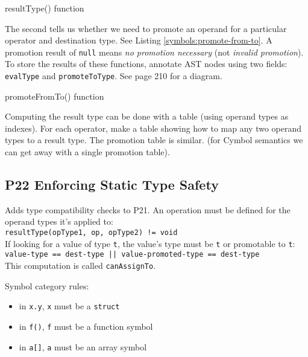 \begin{program}
\caption{resultType() function\label{symbols:result-type}}
\end{program}

The second tells us whether we need to promote an operand
for a particular operator and destination type.
See Listing \ref{symbols:promote-from-to}.
A promotion result of \verb=null= means \emph{no promotion necessary}
(not \emph{invalid promotion}).
To store the results of these functions, annotate AST nodes using two fields:
\verb=evalType= and \verb=promoteToType=.
See page 210 for a diagram.

\begin{program}
\caption{promoteFromTo() function\label{symbols:promote-from-to}}
\end{program}

Computing the result type can be done with a table
(using operand types as indexes).
For each operator, make a table
showing how to map any two operand types to a result type.
The promotion table is similar.
(for Cymbol semantics we can get away with a single promotion table).


\subsection{P22 Enforcing Static Type Safety}

Adds type compatibility checks to P21.
An operation must be defined for the operand types it's applied to:\\
\verb-resultType(opType1, op, opType2) != void-\\
If looking for a value of type \verb=t=,
the value's type must be \verb=t= or promotable to \verb=t=:\\
\verb+value-type == dest-type || value-promoted-type == dest-type+\\
This computation is called \verb=canAssignTo=.

Symbol category rules:
\begin{itemize}
\item in \verb=x.y=, \verb=x= must be a \verb=struct=
\item in \verb=f()=, \verb=f= must be a function symbol
\item in \verb=a[]=, \verb=a= must be an array symbol
\end{itemize}


